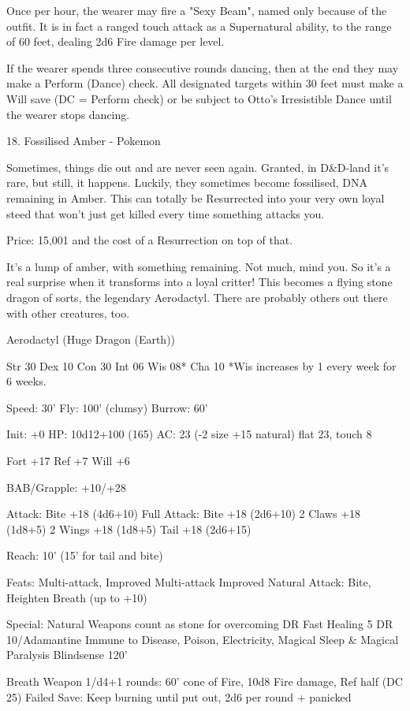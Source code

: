 \begin{multicols}{2}
Once per hour, the wearer may fire a "Sexy Beam", named only because of the outfit. It is in fact a ranged touch attack as a Supernatural ability, to the range of 60 feet, dealing 2d6 Fire damage per level.

If the wearer spends three consecutive rounds dancing, then at the end they may make a Perform (Dance) check. All designated targets within 30 feet must make a Will save (DC = Perform check) or be subject to Otto's Irresistible Dance until the wearer stops dancing.


18. Fossilised Amber - Pokemon

Sometimes, things die out and are never seen again. Granted, in D&D-land it's rare, but still, it happens. Luckily, they sometimes become fossilised, DNA remaining in Amber. This can totally be Resurrected into your very own loyal steed that won't just get killed every time something attacks you.

Price: 15,001 and the cost of a Resurrection on top of that.

It's a lump of amber, with something remaining. Not much, mind you. So it's a real surprise when it transforms into a loyal critter! This becomes a flying stone dragon of sorts, the legendary Aerodactyl. There are probably others out there with other creatures, too.

Aerodactyl (Huge Dragon (Earth))

Str 30 Dex 10 Con 30 Int 06 Wis 08* Cha 10
*Wis increases by 1 every week for 6 weeks.

Speed: 30'
Fly: 100' (clumsy)
Burrow: 60'

Init: +0
HP: 10d12+100 (165)
AC: 23 (-2 size +15 natural)
flat 23, touch 8

Fort +17
Ref +7
Will +6

BAB/Grapple: +10/+28

Attack: Bite +18 (4d6+10)
Full Attack:
Bite +18 (2d6+10)
2 Claws +18 (1d8+5)
2 Wings +18 (1d8+5)
Tail +18 (2d6+15)

Reach: 10' (15' for tail and bite)

Feats:
Multi-attack, Improved Multi-attack
Improved Natural Attack: Bite, Heighten Breath (up to +10)

Special:
Natural Weapons count as stone for overcoming DR
Fast Healing 5
DR 10/Adamantine
Immune to Disease, Poison, Electricity, Magical Sleep & Magical Paralysis
Blindsense 120'

Breath Weapon 1/d4+1 rounds:
60' cone of Fire, 10d8 Fire damage, Ref half (DC 25)
Failed Save: Keep burning until put out, 2d6 per round + panicked


\end{multicols}
